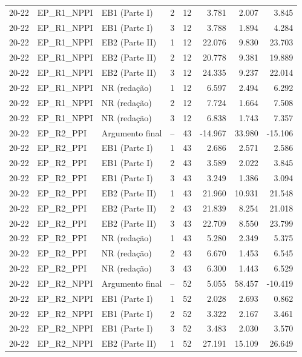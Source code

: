 \begin{longtable}{lllcrrrr}
20-22 & EP\_R1\_NPPI & EB1 (Parte I) & 2 & 12 & 3.781 & 2.007 & 3.845 \\
20-22 & EP\_R1\_NPPI & EB1 (Parte I) & 3 & 12 & 3.788 & 1.894 & 4.284 \\
20-22 & EP\_R1\_NPPI & EB2 (Parte II) & 1 & 12 & 22.076 & 9.830 & 23.703 \\
20-22 & EP\_R1\_NPPI & EB2 (Parte II) & 2 & 12 & 20.778 & 9.381 & 19.889 \\
20-22 & EP\_R1\_NPPI & EB2 (Parte II) & 3 & 12 & 24.335 & 9.237 & 22.014 \\
20-22 & EP\_R1\_NPPI & NR (redação) & 1 & 12 & 6.597 & 2.494 & 6.292 \\
20-22 & EP\_R1\_NPPI & NR (redação) & 2 & 12 & 7.724 & 1.664 & 7.508 \\
20-22 & EP\_R1\_NPPI & NR (redação) & 3 & 12 & 6.838 & 1.743 & 7.357 \\
20-22 & EP\_R2\_PPI & Argumento final & -- & 43 & -14.967 & 33.980 & -15.106 \\
20-22 & EP\_R2\_PPI & EB1 (Parte I) & 1 & 43 & 2.686 & 2.571 & 2.586 \\
20-22 & EP\_R2\_PPI & EB1 (Parte I) & 2 & 43 & 3.589 & 2.022 & 3.845 \\
20-22 & EP\_R2\_PPI & EB1 (Parte I) & 3 & 43 & 3.249 & 1.386 & 3.094 \\
20-22 & EP\_R2\_PPI & EB2 (Parte II) & 1 & 43 & 21.960 & 10.931 & 21.548 \\
20-22 & EP\_R2\_PPI & EB2 (Parte II) & 2 & 43 & 21.839 & 8.254 & 21.018 \\
20-22 & EP\_R2\_PPI & EB2 (Parte II) & 3 & 43 & 22.709 & 8.550 & 23.799 \\
20-22 & EP\_R2\_PPI & NR (redação) & 1 & 43 & 5.280 & 2.349 & 5.375 \\
20-22 & EP\_R2\_PPI & NR (redação) & 2 & 43 & 6.670 & 1.453 & 6.545 \\
20-22 & EP\_R2\_PPI & NR (redação) & 3 & 43 & 6.300 & 1.443 & 6.529 \\
20-22 & EP\_R2\_NPPI & Argumento final & -- & 52 & 5.055 & 58.457 & -10.419 \\
20-22 & EP\_R2\_NPPI & EB1 (Parte I) & 1 & 52 & 2.028 & 2.693 & 0.862 \\
20-22 & EP\_R2\_NPPI & EB1 (Parte I) & 2 & 52 & 3.322 & 2.167 & 3.461 \\
20-22 & EP\_R2\_NPPI & EB1 (Parte I) & 3 & 52 & 3.483 & 2.030 & 3.570 \\
20-22 & EP\_R2\_NPPI & EB2 (Parte II) & 1 & 52 & 27.191 & 15.109 & 26.649 \\

\end{longtable}
